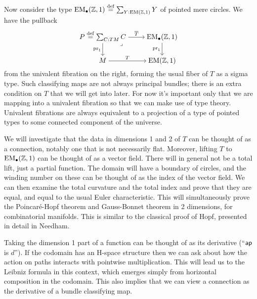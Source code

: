 Now consider the type \( \mathrm{EM_{\bullet}}(\mathbb{Z},1)\stackrel{\mathrm{def}}{=} \sum_{Y:\mathrm{EM}(\mathbb{Z},1)}Y \) of pointed mere circles. We have the pullback
\[\begin{tikzcd}[cramped]
  {P\stackrel{\mathrm{def}}{=}\sum_{C:TM}C} & {\mathrm{EM}_\bullet(\mathbb{Z},1)} \\
  M & {\mathrm{EM}(\mathbb{Z},1)}
  \arrow["{\overline{T}}", from=1-1, to=1-2]
  \arrow["{\mathrm{pr}_1}"', from=1-1, to=2-1]
  \arrow["\lrcorner"{anchor=center, pos=0.125}, draw=none, from=1-1, to=2-2]
  \arrow["{\mathrm{pr}_1}"', from=1-2, to=2-2]
  \arrow["T", from=2-1, to=2-2]
\end{tikzcd}\]
from the univalent fibration on the right, forming the usual fiber of \( T \) as a sigma type. Such classifying maps are not always principal bundles; there is an extra condition on \( T \) that we will get into later. For now it's important only that we are mapping into a univalent fibration so that we can make use of type theory. Univalent fibrations are always equivalent to a projection of a type of pointed types to some connected component of the universe\cite{christensen_univalence}.

We will investigate that the data in dimensions 1 and 2 of \( T \) can be thought of as a connection, notably one that is not necessarily flat. Moreover, lifting \( T \) to \( \mathrm{EM_{\bullet}}(\mathbb{Z},1) \) can be thought of as a vector field. There will in general not be a total lift, just a partial function. The domain will have a boundary of circles, and the winding number on these can be thought of as the index of the vector field. We can then examine the total curvature and the total index and prove that they are equal, and equal to the usual Euler characteristic. This will simultaneously prove the Poincaré-Hopf theorem and Gauss-Bonnet theorem in 2 dimensions, for combinatorial manifolds. This is similar to the classical proof of Hopf\cite{hopf}, presented in detail in Needham\cite{needham}.

Taking the dimension 1 part of a function can be thought of as its derivative (``\( \mathsf{ap} \) is \( d \)''). If the codomain has an H-space structure then we can ask about how the action on paths interacts with pointwise multiplication. This will lead us to the Leibniz formula in this context, which emerges simply from horizontal composition in the codomain. This also implies that we can view a connection as the derivative of a bundle classifying map.

